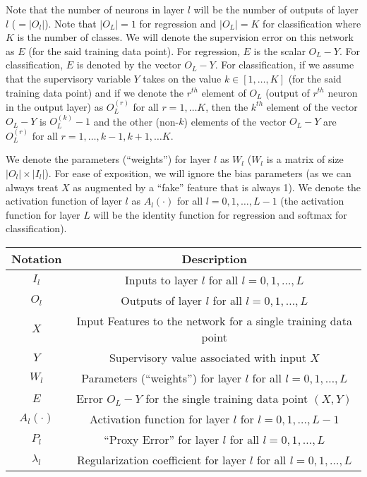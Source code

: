 \documentclass[10pt]{amsart}
\begin{document}
Note that the number of neurons in layer $l$ will be the number of outputs of layer $l$ ($ = | O_l |$). Note that $| O_L | = 1$ for regression and $| O_L | = K$ for classification where $K$ is the number of classes. We will denote the supervision error on this network as $E$ (for the said training data point). For regression, $E$ is the scalar $O_L - Y$. For classification, $E$ is denoted by the vector $O_L - Y$. For classification, if we assume that the supervisory variable $Y$ takes on the value $k \in [1, \ldots ,K]$ (for the said training data point) and if we denote the $r^{th}$ element of $O_L$ (output of $r^{th}$ neuron in the output layer) as $O_L^{(r)}$ for all $r = 1, \ldots K$, then the $k^{th}$ element of the vector $O_L - Y$ is $O_L^{(k)} - 1$ and the other (non-$k$) elements of the vector $O_L - Y$ are $O_L^{(r)}$ for all $r = 1, \ldots, k - 1, k + 1, \ldots K$.

We denote the parameters (``weights'') for layer $l$ as $W_l$ ($W_l$ is a matrix of size $| O_l | \times | I_l |$). For ease of exposition, we will ignore the bias parameters (as we can always treat $X$ as augmented by a ``fake'' feature that is always 1). We denote the activation function of layer $l$ as $A_l(\cdot)$ for all $l = 0, 1, \ldots, L - 1$ (the activation function for layer $L$ will be the identity function for regression and softmax for classification).
\begin{center} 
\begin{tabular}{|c|c|}
\hline
\textbf{Notation} & \textbf{Description} \\
\hline
$I_l$ & Inputs to layer $l$ for all $l = 0, 1, \ldots, L$  \\
\hline
$O_l$ & Outputs of layer $l$ for all $l = 0, 1, \ldots, L$ \\
\hline
$X$ & Input Features to the network for a single training data point \\
\hline
 $Y$ & Supervisory value associated with input $X$ \\
\hline
 $W_l$ & Parameters (``weights'') for layer $l$ for all $l = 0, 1, \ldots, L$ \\
 \hline
 $E$ & Error $O_L - Y$ for the single training data point $(X,Y)$ \\
 \hline
 $A_l(\cdot)$ & Activation function for layer $l$ for $l = 0, 1, \ldots, L - 1$ \\
 \hline
 $P_l$ & ``Proxy Error'' for layer $l$ for all $l = 0, 1, \ldots, L$ \\
 \hline
 $\lambda_l$ & Regularization coefficient for layer $l$ for all $l = 0, 1, \ldots, L$ \\
 \hline
\end{tabular}
\end{center}
\end{document}
